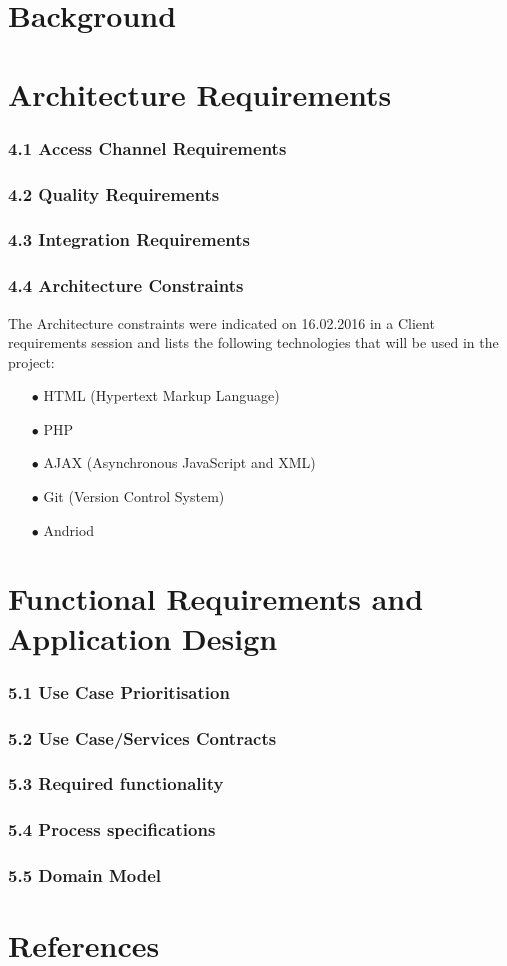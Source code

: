 \documentclass[a4paper,12pt]{report}
\begin{document}
\newpage
\section{Background}

\newpage
\section{Architecture Requirements}
\subsubsection{4.1 Access Channel Requirements}
\subsubsection{4.2 Quality Requirements}
\subsubsection{4.3 Integration Requirements}

\subsubsection{4.4 Architecture Constraints}
The Architecture constraints were indicated on 16.02.2016 in a Client requirements session and lists the following technologies that will be used in the project:
\begin{itemize}
	\item[$\bullet$]HTML (Hypertext Markup Language) 
	\item[$\bullet$]PHP
	\item[$\bullet$]AJAX (Asynchronous JavaScript and XML)
	\item[$\bullet$]Git (Version Control System)
	\item[$\bullet$]Andriod
	\\
\end{itemize}

\newpage
\section{Functional Requirements and Application Design}
\subsubsection{5.1 Use Case Prioritisation}
\subsubsection{5.2 Use Case/Services Contracts}
\subsubsection{5.3 Required functionality}
\subsubsection{5.4 Process specifications}
\subsubsection{5.5 Domain Model}

\newpage
\section{References}
\end{document}
